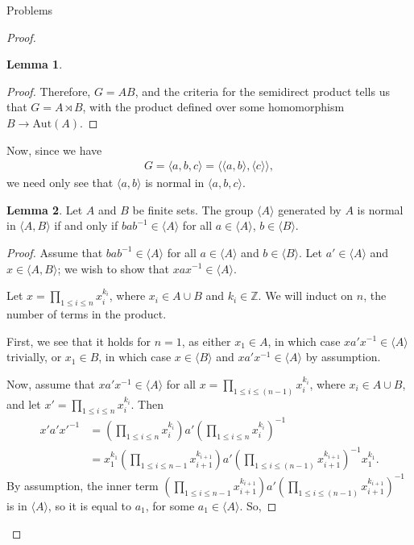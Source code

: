 \documentclass[12pt]{article}
\newcommand{\Z}{\mathbb{Z}}
\theoremstyle{definition}
\newtheorem{lemma}{Lemma}
\newenvironment{problem}[2][Problem]{\begin{trivlist}
\item[\hskip \labelsep {\bfseries #1}\hskip \labelsep {\bfseries #2.}]}{\end{trivlist}}
\begin{document}
\begin{section}{Problems}
\begin{problem}{1}
\begin{proof}
\begin{lemma}
\begin{proof}
		        \par Therefore, $G = AB$, and the criteria for the semidirect product tells us that $G = A \rtimes B$, with the product defined over some homomorphism $B \to \text{Aut}(A)$.
		    \end{proof}
		\end{lemma}
		\par Now, since we have 
		\begin{align*}G = \langle a, b, c \rangle = \langle \langle a, b \rangle, \langle c \rangle \rangle,
		\end{align*}
		we need only see that $\langle a, b \rangle$ is normal in $\langle a, b, c\rangle$.
		\begin{lemma}
			Let $A$ and $B$ be finite sets. The group $\langle A\rangle$ generated by $A$ is normal in $\langle A, B\rangle$ if and only if $bab^{-1} \in \langle A\rangle$ for all $a \in \langle A\rangle$, $b \in \langle B\rangle$.
			\begin{proof}
				Assume that $bab^{-1} \in \langle A\rangle$ for all $a \in \langle A\rangle $ and $b \in \langle B\rangle$. Let $a' \in \langle A\rangle$ and $x \in \langle A, B\rangle$; we wish to show that $xax^{-1} \in \langle A\rangle$.
				\par Let $x = \prod_{1 \leq i \leq n} x_i^{k_i}$, where $x_i \in A \cup B$ and $k_i \in \Z$. We will induct on $n$, the number of terms in the product.
				\par First, we see that it holds for $n = 1$, as either $x_1 \in A$, in which case $xa'x^{-1} \in \langle A\rangle$ trivially, or $x_1 \in B$, in which case $x \in \langle B\rangle$ and $xa'x^{-1} \in \langle A\rangle$ by assumption.
				\par Now, assume that $xa'x^{-1} \in \langle A\rangle$ for all $x = \prod_{1 \leq i \leq (n-1)} x_i^{k_i}$, where $x_i \in A \cup B$, and let $x' = \prod_{1 \leq i \leq n}x_i^{k_i}$. Then
				\begin{align*}
					x'a'x'^{-1} &= \left( \prod_{1 \leq i \leq n} x_i^{k_i} \right)a' \left( \prod_{1 \leq i \leq n} x_{i}^{k_i} \right)^{-1}\\
					&= x_1^{k_1} \left( \prod_{1 \leq i \leq n-1} x_{i+1}^{k_{i+1}} \right)a' \left( \prod_{1 \leq i \leq \left( n-1 \right)} x_{i+1}^{k_{i+1}}\right)^{-1}x_{1}^{k_1}.
				\end{align*}
				By assumption, the inner term $\left( \prod_{1 \leq i \leq n-1} x_{i+1}^{k_{i+1}} \right)a' \left( \prod_{1 \leq i \leq \left( n-1 \right)} x_{i+1}^{k_{i+1}}\right)^{-1}$ is in $\langle A\rangle$, so it is equal to $a_1$, for some $a_1 \in \langle A\rangle$. So,

\end{proof}
\end{lemma}
\end{proof}
\end{problem}
\end{section}
\end{document}
